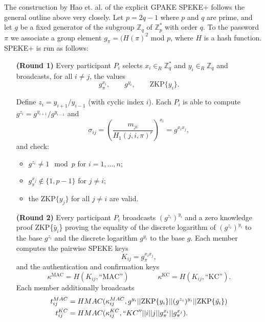 The construction by Hao et. al. of the explicit GPAKE SPEKE+ follows the general outline above very closely.  Let $p = 2q - 1$ where $p$ and $q$ are prime, and let $g$ be a fixed generator of the subgroup $\mathbb{Z}_q$ of $\mathbb{Z}_p^*$ with order $q$.  To the password $\pi$ we associate a group element $g_{\pi} = (H(\pi)^2$ mod $p$, where $H$ is a hash function. SPEKE+ is run as follows:
\\

\begin{itemize}
    \item[\textbf{(Round 1)}] Every participant $P_i$ selects $x_i\in_R \mathbb{Z}_q^*$ and $y_i\in_R \mathbb{Z}_q$ and 
        broadcasts, for all $i \neq j$, the values
        \[g_{\pi}^{x_i} , \qquad g^{y_i}, \qquad \text{ZKP}\{y_i\}.\]
    \item[]
    \item[] Define $z_i = y_{i+1} / y_{i-1}$ (with cyclic index $i$). Each $P_i$ is able to compute $g^{z_i} = g^{y_{i+1}} / g^{y_{i-1}}$ and 
    \[ \sigma_{ij} = \left(\frac{m_{ji}}{H_1(j,i,\pi)^r}\right)^{x_i} = g^{x_i x_j},\] 
    and check: 
    \begin{itemize}
            \item $g^{z_i} \neq 1 \mod p$ for $i = 1, \ldots, n$;
            \item $g_{\pi}^{x_j} \notin \{1,p-1\}$ for $j \neq i$;
            \item the $\text{ZKP}\{y_j\}$ for all $j \neq i$ are valid.
        \end{itemize}
    \item[]
    \item[\textbf{(Round 2)}] Every participant $P_i$ broadcasts $(g^{z_i})^{y_i}$ and a zero knowledge proof
        ZKP\{$\tilde{y_i}$\} proving the equality of the discrete logarithm of $(g^{z_i})^{y_i}$ to the base
        $g^{z_i}$ and the discrete logarithm $g^{y_i}$ to the base $g$. Each member computes the pairwise SPEKE keys
        \[ K_{ij} = g_{\pi}^{x_ix_j}, \]
        and the authentication and confirmation keys
        \[\kappa^{\text{MAC}} = H(K_{ij}, \text{``MAC''})\qquad\qquad \kappa^{\text{KC}} = H(K_{ij}, \text{``KC''}).\]
        Each member additionally broadcasts 
        \begin{align*}
        t_{ij}^{MAC} &= HMAC(\kappa_{ij}^{MAC},  g^{y_i} || \text{ZKP}\{y_i\} || (g^{z_i})^{y_i} || \text{ZKP}\{\tilde{y_i}\})\\
        t_{ij}^{KC} &= HMAC(\kappa_{ij}^{KC}, ``KC'' || i || j || g_{\pi}^{x_i} || g_{\pi}^{x_j}).

\end{align*}
\end{itemize}
